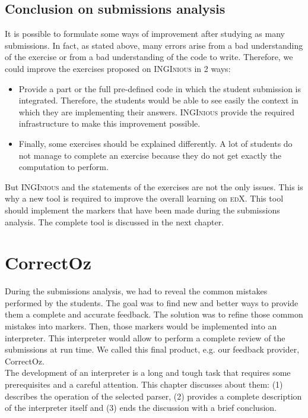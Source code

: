 \documentclass[11pt,a4paper,twoside,openright]{report}
\begin{document}
\section{Conclusion on submissions analysis}
It is possible to formulate some ways of improvement after studying as many 
submissions. In fact, as stated above, many errors arise from a bad 
understanding of the exercise or from a bad understanding of the code to write. 
Therefore, we could improve the exercises proposed on \textsc{INGInious} in 2 
ways:
\begin{itemize}
 \item Provide a part or the full pre-defined code in which the student 
submission is integrated. Therefore, the students would be able to see easily 
the context in which they are implementing their answers. \textsc{INGInious} 
provide the required infrastructure to make this improvement possible.
 \item Finally, some exercises should be explained differently. A lot of 
students do not manage to complete an exercise because they do not get exactly 
the computation to perform.
\end{itemize}

But \textsc{INGInious} and the statements of the exercises are not the only 
issues. This is why a new tool is required to improve the overall learning 
on \textsc{edX}. This tool should implement the markers that have been made 
during the submissions analysis. The complete tool is discussed in the next chapter.

\chapter{CorrectOz} \label{chap:tool}

During the submissions analysis, we had to reveal the common mistakes performed 
by the students. The goal was to find new and better ways to provide them a 
complete and accurate feedback. The solution was to refine those common 
mistakes 
into markers. Then, those markers would be implemented into an interpreter. This 
interpreter would allow to perform a complete review of the submissions at run 
time. We called this final product, e.g. our feedback provider, CorrectOz. \\

The development of an interpreter is a long and tough task that requires some 
prerequisites and a careful attention. This chapter discusses about them: (1) 
describes the operation of the selected parser, (2) provides a complete 
description of the interpreter itself and (3) ends the discussion with a brief 
conclusion.
\end{document}
